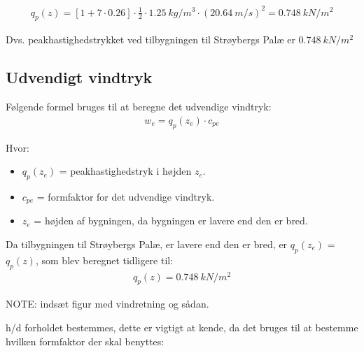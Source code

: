 \begin{align*}
q_{p}(z) = [1 + 7 \cdot 0.26] \cdot \frac{1}{2} \cdot \SI{1,25}{kg/m^3} \cdot (\SI{20,64}{m/s})^2 = \SI{0,748}{kN/m^2}
\end{align*}

Dvs. peakhastighedstrykket ved tilbygningen til Strøybergs Palæ er $ \SI{0,748}{kN/m^2} $


\subsection{Udvendigt vindtryk}

Følgende formel bruges til at beregne det udvendige vindtryk:
\begin{align*}
w_{e} = q_{p}(z_{e}) \cdot c_{pe}
\end{align*}

Hvor:
\begin{itemize}
\item $ q_{p}(z_{e}) $ = peakhastighedstryk i højden $ z_{e} $.
\item $ c_{pe} $ = formfaktor for det udvendige vindtryk.
\item $ z_{e} $ = højden af bygningen, da bygningen er lavere end den er bred.
\end{itemize}

Da tilbygningen til Strøybergs Palæ, er lavere end den er bred, er $ q_{p}(z_{e}) $ = $ q_{p}(z) $, som blev beregnet tidligere til:
\begin{align*}
q_{p}(z) = \SI{0,748}{kN/m^2}
\end{align*}

NOTE: indsæt figur med vindretning og sådan.

h/d forholdet bestemmes, dette er vigtigt at kende, da det bruges til at bestemme hvilken formfaktor der skal benyttes:



 
















